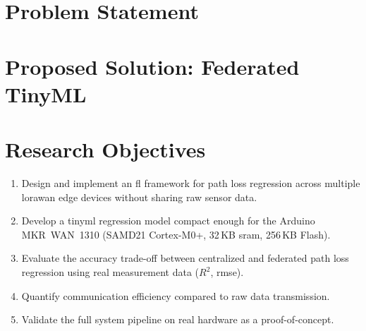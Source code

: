 \documentclass[12pt, a4paper, twoside, openright]{report}
\begin{document}

\section{Problem Statement}
\label{sec:problem-statement}

\section{Proposed Solution: Federated TinyML}
\label{sec:proposed-solution}
%

\section{Research Objectives}
\label{sec:objectives}
\begin{enumerate}
  \item Design and implement an \gls{fl} framework for path loss regression across multiple \gls{lorawan} edge devices without sharing raw sensor data.
  \item Develop a \gls{tinyml} regression model compact enough for the Arduino MKR~WAN~1310 (SAMD21 Cortex-M0+, 32\,KB \gls{sram}, 256\,KB Flash).
  \item Evaluate the accuracy trade-off between centralized and federated path loss regression using real measurement data ($R^2$, \gls{rmse}).
  \item Quantify communication efficiency compared to raw data transmission.
  \item Validate the full system pipeline on real hardware as a proof-of-concept.
\end{enumerate}
\end{document}
